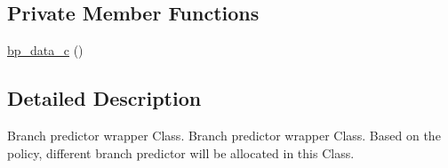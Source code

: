 \subsection*{Private Member Functions}
\begin{DoxyCompactItemize}
\item 
\hyperlink{classbp__data__c_aedb2a645e6f24788d898e62210300cd3}{bp\_\-data\_\-c} ()
\end{DoxyCompactItemize}


\subsection{Detailed Description}
Branch predictor wrapper Class. Branch predictor wrapper Class. Based on the policy, different branch predictor will be allocated in this Class. 

